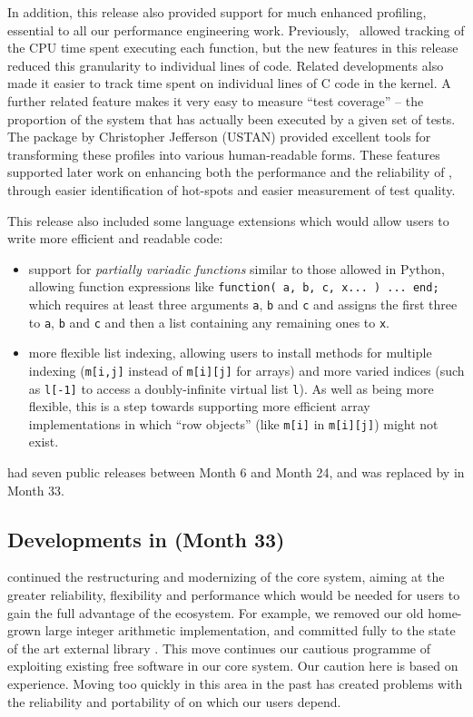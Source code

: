 In addition, this release also provided support for much enhanced
profiling, essential to all our performance engineering work.
Previously, \GAP\ allowed tracking of the CPU time spent
executing each function, but the new features in this release
reduced this granularity to individual lines of \GAP
code. Related developments also made it easier to track time spent on
individual lines of C code in the \GAP kernel. A further related
feature makes it very easy to measure ``test coverage'' -- the
proportion of the system that has actually been executed by a given
set of tests. The  package \cite{profiling} by Christopher Jefferson
(USTAN) provided excellent tools for transforming these profiles into
various human-readable forms. These features supported later work on
enhancing both the performance and the reliability of \GAP, through
easier identification of hot-spots and easier measurement of test
quality.

This release also included some language extensions which would allow
users to write more efficient and readable code:

\begin{itemize}
  \item support for \emph{partially
  variadic functions} similar to those allowed in Python, allowing
function expressions like
\verb|function( a, b, c, x... ) ... end;|
which requires at least three arguments \verb|a|, \verb|b| and
\verb|c| and assigns the first three to \verb|a|, \verb|b| and \verb|c|
and then a list containing any remaining ones to \verb|x|.
\item more flexible list indexing, allowing users to install methods
  for multiple indexing (\verb|m[i,j]| instead of \verb|m[i][j]| for
  arrays) and more varied indices (such as \verb|l[-1]| to access a
  doubly-infinite virtual list \verb|l|). As well as being more
  flexible, this is a step towards supporting more efficient array
  implementations in which ``row objects'' (like \verb|m[i]| in
  \verb|m[i][j]|) might not exist.
\end{itemize}

 had seven public releases between Month 6 and Month 24, and
was replaced by  in Month 33.

\subsection{Developments in  (Month 33)}\label{gap-4.9}

 continued the restructuring and modernizing of the core \GAP
system, aiming at the greater reliability, flexibility and performance
which would be needed for \GAP users to gain the full advantage of the \ODK ecosystem.
For example, we removed our old home-grown large integer arithmetic
implementation, and committed fully to the state of the art external
library \href{https://gmplib.org/}{}. This
move continues our cautious programme of exploiting existing free
software in our core system. Our caution here is based on
experience. Moving too quickly in this area in the past has created
problems with the reliability and
portability of \GAP on which our users depend.

